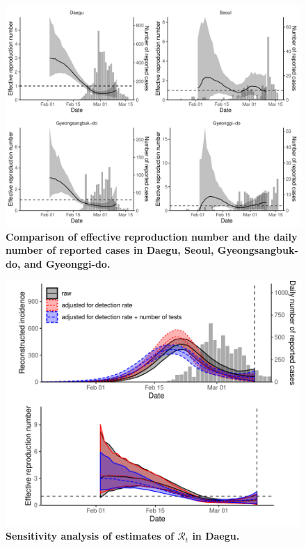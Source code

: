 \documentclass[12pt]{article}
\begin{document}
\begin{figure}[!ht]
\includegraphics[width=\textwidth]{figure_R_t_all.pdf}
\caption{
\textbf{Comparison of effective reproduction number and the daily number of reported cases in Daegu, Seoul, Gyeongsangbuk-do, and Gyeonggi-do.}
}
\end{figure}

\pagebreak

\begin{figure}[!ht]
\includegraphics[width=\textwidth]{figure_R_t_daegu.pdf}
\caption{
\textbf{Sensitivity analysis of estimates of $\mathcal R_t$ in Daegu.}
}
\end{figure}
\end{document}
